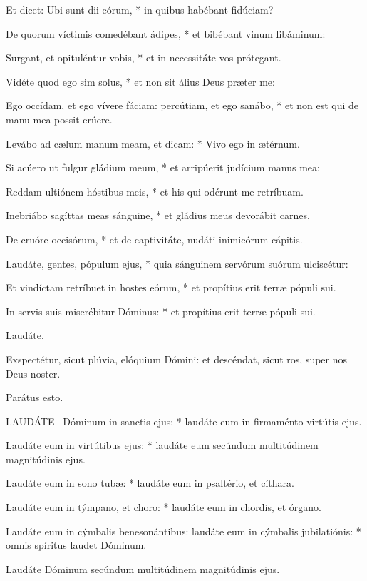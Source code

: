Et dicet: Ubi sunt dii eórum, * in quibus habébant fidúciam?

De quorum víctimis comedébant ádipes, * et bibébant vinum libáminum:

Surgant, et opituléntur vobis, * et in necessitáte vos prótegant.

Vidéte quod ego sim solus, * et non sit álius Deus præter me:

Ego occídam, et ego vívere fáciam: percútiam, et ego sanábo, * et non est qui de manu mea possit erúere.

Levábo ad cælum manum meam, et dicam: * Vivo ego in ætérnum.

Si acúero ut fulgur gládium meum, * et arripúerit judícium manus mea:

Reddam ultiónem hóstibus meis, * et his qui odérunt me retríbuam.

Inebriábo sagíttas meas sánguine, * et gládius meus devorábit carnes,

De cruóre occisórum, * et de captivitáte, nudáti inimicórum cápitis.

Laudáte, gentes, pópulum ejus, * quia sánguinem servórum suórum ulciscétur:

Et vindíctam retríbuet in hostes eórum, * et propítius erit terræ pópuli sui.

 In servis suis miserébitur Dóminus: * et propítius erit terræ pópuli sui.

 Laudáte. \dag


 Exspectétur, sicut plúvia, elóquium Dómini: et descéndat, sicut ros, super nos Deus noster.

 Parátus esto.


\lettrine[lines=2]{L}{AUDÁTE} \dag\ Dóminum in sanctis ejus: * laudáte eum in firmaménto virtútis ejus.

Laudáte eum in virtútibus ejus: * laudáte eum secúndum multitúdinem magnitúdinis ejus.

Laudáte eum in sono tubæ: * laudáte eum in psaltério, et cíthara.

Laudáte eum in týmpano, et choro: * laudáte eum in chordis, et órgano.

Laudáte eum in cýmbalis benesonántibus: laudáte eum in cýmbalis jubilatiónis: * omnis spíritus laudet Dóminum.

 Laudáte Dóminum secúndum multitúdinem magnitúdinis ejus.

